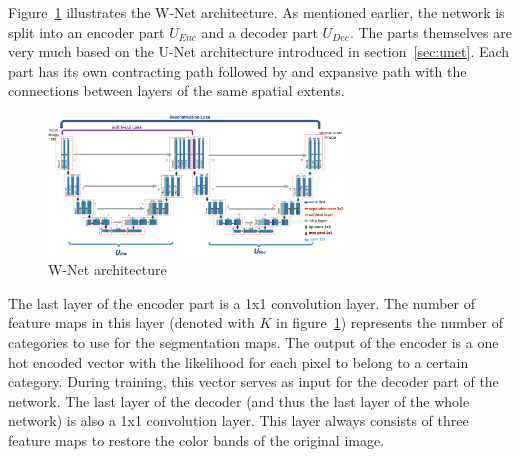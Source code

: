 Figure~\ref{fig:wnet_architecture} illustrates the W-Net architecture. As mentioned earlier, the network is split into an encoder part $U_{Enc}$ and a decoder part $U_{Dec}$. The parts themselves are very much based on the U-Net architecture introduced in section~\ref{sec:unet}. Each part has its own contracting path followed by and expansive path with the connections between layers of the same spatial extents.

\begin{figure}[h]
    \centering
    \includegraphics[width=0.7\textwidth]{images/w-net-architecture}
    \caption{W-Net architecture~\cite{wnet17}}
    \label{fig:wnet_architecture}
\end{figure}

The last layer of the encoder part is a 1x1 convolution layer. The number of feature maps in this layer (denoted with $K$ in figure~\ref{fig:wnet_architecture}) represents the number of categories to use for the segmentation maps. The output of the encoder is a one hot encoded vector with the likelihood for each pixel to belong to a certain category. During training, this vector serves as input for the decoder part of the network. The last layer of the decoder (and thus the last layer of the whole network) is also a 1x1 convolution layer. This layer always consists of three feature maps to restore the color bands of the original image.


